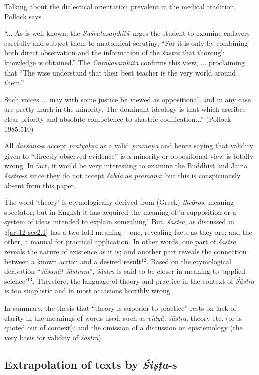 Talking about the dialectical orientation prevalent in the medical tradition, Pollock says
\begin{myquote}
``... As is well known, the {\sl Suśrutasaṃhitā} urges the student to examine cadavers carefully and subject them to anatomical scrutiny, ``For it is only by combining both direct observation and the information of the {\sl śāstra} that thorough knowledge is obtained.'' The {\sl Carakasaṃhita} conﬁrms this view, ... proclaiming that ``The wise understand that their best teacher is the very world around them.''

Such voices ... may with some justice be viewed as oppositional, and in any case are pretty much in the minority. The dominant ideology is that which ascribes clear priority and absolute competence to shastric codiﬁcation...'' (Pollock 1985:510)
\end{myquote}

All {\sl darśana}-s accept {\sl pratyakṣa} as a valid {\sl pramāṇa} and hence saying that validity given to ``directly observed evidence'' is a minority or oppositional view is totally wrong. In fact, it  would be very interesting to examine the Buddhist and Jaina {\sl śāstra}-s since they do not accept {\sl śabda} as {\sl pramāṇa}; but this is conspicuously absent from this paper.

The word `theory' is etymologically derived from (Greek) {\sl theōros}, meaning spectator; but in English it has acquired the meaning of `a supposition or a system of ideas intended to explain something'. But, {\sl śāstra}, as discussed in \$\ref{art12-sec2.1} has a two-fold meaning -- one, revealing facts as they are; and the other, a manual for practical application. In other words, one part of {\sl śāstra} reveals the nature of existence as it is; and another part reveals the connection between a known action and a desired result$^{12}$. Based on the etymological derivation ``{\sl śāsanāt śāstram}'', {\sl śāstra} is said to be closer in meaning to `applied science'$^{13}$. Therefore, the language of theory and practice in the context of {\sl Śāstra} is too simplistic and in most occasions horribly wrong. 

In summary, the thesis that ``theory is superior to practice'' rests on lack of clarity in the meanings of words used, such as {\sl vidyā, śāstra}, theory etc. (or is quoted out of context); and the omission of a discussion on epistemology (the very basis for validity of {\sl śāstra}).

\subsection{Extrapolation of texts by {{\sl\bfseries Śiṣṭa}\relax}-s}\label{art12-sec3.6}

